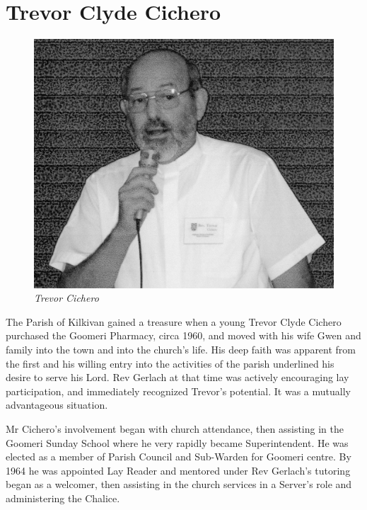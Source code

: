 \section{Trevor Clyde Cichero}









\begin{figure}
\begin{center}
\includegraphics[width=.7\linewidth,center]{../images/TrevorChicero.jpg}
\caption{\itshape Trevor Cichero}
\end{center}
\end{figure}




The Parish of Kilkivan gained a treasure when a young Trevor Clyde Cichero purchased the Goomeri Pharmacy, circa 1960, and moved with his wife Gwen and family into the town and into the church's life. His deep faith was apparent from the first and his willing entry into the activities of the parish underlined his desire to serve his Lord. Rev Gerlach at that time was actively encouraging lay participation, and immediately recognized Trevor's potential. It was a mutually advantageous situation.



Mr Cichero's involvement began with church attendance, then assisting in the Goomeri Sunday School where he very rapidly became Superintendent. He was elected as a member of Parish Council and Sub-Warden for Goomeri centre. By 1964 he was appointed Lay Reader and mentored under Rev Gerlach's tutoring began as a welcomer, then assisting in the church services in a Server's role and administering the Chalice.



